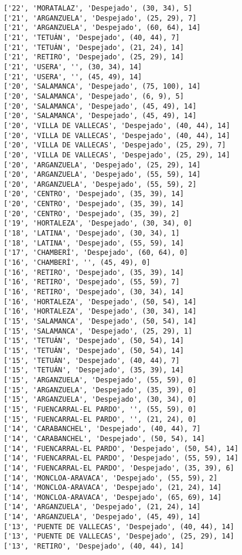 \documentclass[11pt]{article}
\begin{document}
\begin{Verbatim}[commandchars=\\\{\}]
['22', 'MORATALAZ', 'Despejado', (30, 34), 5]
['21', 'ARGANZUELA', 'Despejado', (25, 29), 7]
['21', 'ARGANZUELA', 'Despejado', (60, 64), 14]
['21', 'TETUÁN', 'Despejado', (40, 44), 7]
['21', 'TETUÁN', 'Despejado', (21, 24), 14]
['21', 'RETIRO', 'Despejado', (25, 29), 14]
['21', 'USERA', '', (30, 34), 14]
['21', 'USERA', '', (45, 49), 14]
['20', 'SALAMANCA', 'Despejado', (75, 100), 14]
['20', 'SALAMANCA', 'Despejado', (6, 9), 5]
['20', 'SALAMANCA', 'Despejado', (45, 49), 14]
['20', 'SALAMANCA', 'Despejado', (45, 49), 14]
['20', 'VILLA DE VALLECAS', 'Despejado', (40, 44), 14]
['20', 'VILLA DE VALLECAS', 'Despejado', (40, 44), 14]
['20', 'VILLA DE VALLECAS', 'Despejado', (25, 29), 7]
['20', 'VILLA DE VALLECAS', 'Despejado', (25, 29), 14]
['20', 'ARGANZUELA', 'Despejado', (25, 29), 14]
['20', 'ARGANZUELA', 'Despejado', (55, 59), 14]
['20', 'ARGANZUELA', 'Despejado', (55, 59), 2]
['20', 'CENTRO', 'Despejado', (35, 39), 14]
['20', 'CENTRO', 'Despejado', (35, 39), 14]
['20', 'CENTRO', 'Despejado', (35, 39), 2]
['19', 'HORTALEZA', 'Despejado', (30, 34), 0]
['18', 'LATINA', 'Despejado', (30, 34), 1]
['18', 'LATINA', 'Despejado', (55, 59), 14]
['17', 'CHAMBERÍ', 'Despejado', (60, 64), 0]
['16', 'CHAMBERÍ', '', (45, 49), 0]
['16', 'RETIRO', 'Despejado', (35, 39), 14]
['16', 'RETIRO', 'Despejado', (55, 59), 7]
['16', 'RETIRO', 'Despejado', (30, 34), 14]
['16', 'HORTALEZA', 'Despejado', (50, 54), 14]
['16', 'HORTALEZA', 'Despejado', (30, 34), 14]
['15', 'SALAMANCA', 'Despejado', (50, 54), 14]
['15', 'SALAMANCA', 'Despejado', (25, 29), 1]
['15', 'TETUÁN', 'Despejado', (50, 54), 14]
['15', 'TETUÁN', 'Despejado', (50, 54), 14]
['15', 'TETUÁN', 'Despejado', (40, 44), 7]
['15', 'TETUÁN', 'Despejado', (35, 39), 14]
['15', 'ARGANZUELA', 'Despejado', (55, 59), 0]
['15', 'ARGANZUELA', 'Despejado', (35, 39), 0]
['15', 'ARGANZUELA', 'Despejado', (30, 34), 0]
['15', 'FUENCARRAL-EL PARDO', '', (55, 59), 0]
['15', 'FUENCARRAL-EL PARDO', '', (21, 24), 0]
['14', 'CARABANCHEL', 'Despejado', (40, 44), 7]
['14', 'CARABANCHEL', 'Despejado', (50, 54), 14]
['14', 'FUENCARRAL-EL PARDO', 'Despejado', (50, 54), 14]
['14', 'FUENCARRAL-EL PARDO', 'Despejado', (55, 59), 14]
['14', 'FUENCARRAL-EL PARDO', 'Despejado', (35, 39), 6]
['14', 'MONCLOA-ARAVACA', 'Despejado', (55, 59), 2]
['14', 'MONCLOA-ARAVACA', 'Despejado', (21, 24), 14]
['14', 'MONCLOA-ARAVACA', 'Despejado', (65, 69), 14]
['14', 'ARGANZUELA', 'Despejado', (21, 24), 14]
['14', 'ARGANZUELA', 'Despejado', (45, 49), 14]
['13', 'PUENTE DE VALLECAS', 'Despejado', (40, 44), 14]
['13', 'PUENTE DE VALLECAS', 'Despejado', (25, 29), 14]
['13', 'RETIRO', 'Despejado', (40, 44), 14]

\end{Verbatim}
\end{document}
